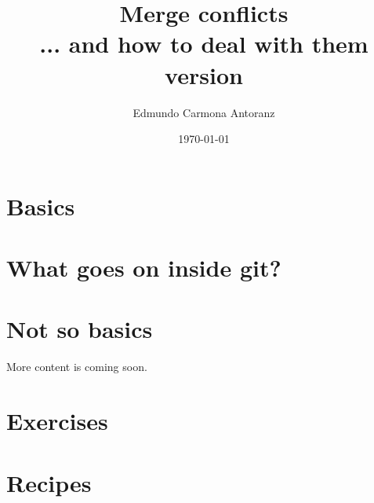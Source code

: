 \documentclass{report}
\title{Merge conflicts\\
	\large ... and how to deal with them\\
	
	\small version \versionnumber}
\author{Edmundo Carmona Antoranz}
\date{\today}
\begin{document}
\begin{titlepage}
\maketitle
\end{titlepage}


\clearpage


\clearpage


\clearpage


\clearpage


\clearpage


\clearpage

\chapter{Basics}

\clearpage


\clearpage


\clearpage


\clearpage


\clearpage


\clearpage


\clearpage


\chapter{What goes on inside git?}

\clearpage

\chapter{Not so basics}

\clearpage


\clearpage

More content is coming soon.

\chapter{Exercises}

\clearpage

\chapter{Recipes}
\label{recipes}

\clearpage
\end{document}
